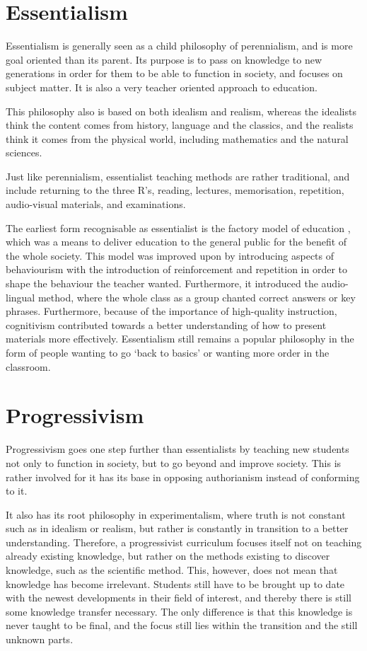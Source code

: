 \section{Essentialism}

Essentialism is generally seen as a child philosophy of perennialism, and is more goal oriented than its parent. Its purpose is to pass on knowledge to new generations in order for them to be able to function in society, and focuses on subject matter. It is also a very teacher oriented approach to education.

This philosophy also is based on both idealism and realism, whereas the idealists think the content comes from history, language and the classics, and the realists think it comes from the physical world, including mathematics and the natural sciences.

Just like perennialism, essentialist teaching methods are rather traditional, and include returning to the three R's, reading, lectures, memorisation, repetition, audio-visual materials, and examinations.

The earliest form recognisable as essentialist is the factory model of education \cite{honours}, which was a means to deliver education to the general public for the benefit of the whole society. This model was improved upon by introducing aspects of behaviourism with the introduction of reinforcement and repetition in order to shape the behaviour the teacher wanted. Furthermore, it introduced the audio-lingual method, where the whole class as a group chanted correct answers or key phrases. Furthermore, because of the importance of high-quality instruction, cognitivism contributed towards a better understanding of how to present materials more effectively. Essentialism still remains a popular philosophy in the form of people wanting to go `back to basics' or wanting more order in the classroom.

\section{Progressivism}

Progressivism goes one step further than essentialists by teaching new students not only to function in society, but to go beyond and improve society. This is rather involved for it has its base in opposing authorianism instead of conforming to it.

It also has its root philosophy in experimentalism, where truth is not constant such as in idealism or realism, but rather is constantly in transition to a better understanding. Therefore, a progressivist curriculum focuses itself not on teaching already existing knowledge, but rather on the methods existing to discover knowledge, such as the scientific method. This, however, does not mean that knowledge has become irrelevant. Students still have to be brought up to date with the newest developments in their field of interest, and thereby there is still some knowledge transfer necessary. The only difference is that this knowledge is never taught to be final, and the focus still lies within the transition and the still unknown parts.


